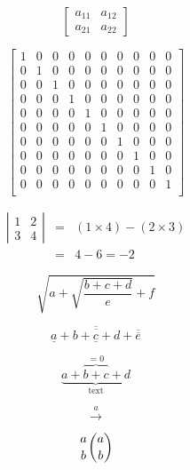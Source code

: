 \documentclass[12pt,a4paper]{article}
\theoremstyle{clearprint}
\begin{document}
\noindent 
\[
\left[\begin{array}{cc} a_{11} & a_{12}\\ a_{21} & a_{22}\end{array}\right]
\]

\noindent 
\[
\left[\begin{array}{*{10}{c}} 
1 & 0 & 0 & 0 & 0 & 0 & 0 & 0 & 0 & 0 \\
0 & 1 & 0 & 0 & 0 & 0 & 0 & 0 & 0 & 0 \\
0 & 0 & 1 & 0 & 0 & 0 & 0 & 0 & 0 & 0 \\
0 & 0 & 0 & 1 & 0 & 0 & 0 & 0 & 0 & 0 \\ 
0 & 0 & 0 & 0 & 1 & 0 & 0 & 0 & 0 & 0 \\ 
0 & 0 & 0 & 0 & 0 & 1 & 0 & 0 & 0 & 0 \\ 
0 & 0 & 0 & 0 & 0 & 0 & 1 & 0 & 0 & 0 \\ 
0 & 0 & 0 & 0 & 0 & 0 & 0 & 1 & 0 & 0 \\ 
0 & 0 & 0 & 0 & 0 & 0 & 0 & 0 & 1 & 0 \\ 
0 & 0 & 0 & 0 & 0 & 0 & 0 & 0 & 0 & 1 \\ 
\end{array}\right]
\]

\noindent 
\begin{eqnarray*}
\left|\begin{array}{cc} 1 & 2\\ 3 & 4\end{array}\right| &=& (1\times 4) - (2 \times 3)\\
&=& 4-6 = -2
\end{eqnarray*}

\noindent 
\[
\sqrt{a + \sqrt{\frac{b + c + d}{e}} + f}
\]

\noindent 
\[
\overline{\underline{a} + \overline{b + \underline{c} + d} + \overline{\overline{e}}}
\]

\noindent 
\[
\underbrace{a + \overbrace{b + c}^{=0} + d}_{\mbox{text}}
\]

\noindent 
\[
\stackrel{a}{\longrightarrow}
\]

\noindent
\[
{a \atop b} {a \choose b}
\]
\end{document}
